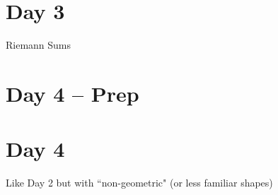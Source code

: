 \documentclass[letterpaper,oneside]{book}%
\theoremstyle{plain}
\theoremstyle{box}
\theoremstyle{problem}
\begin{document}
\section{Day 3}
Riemann Sums



\section{Day 4 -- Prep}

\section{Day 4}
Like Day 2 but with ``non-geometric" (or less familiar shapes)

\end{document}
